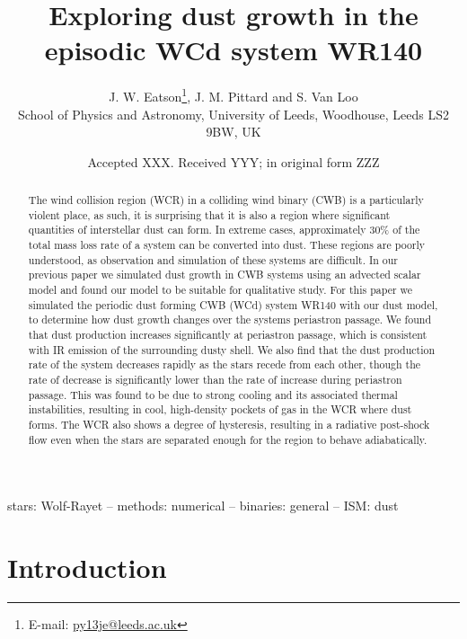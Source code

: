 \documentclass[fleqn,usenatbib]{mnras}
\title[Dust growth simulations of WR140]{Exploring dust growth in the episodic WCd system WR140}
\author[J. W. Eatson, J. M. Pittard \& S. Van Loo]{
J. W. Eatson\thanks{E-mail: \href{mailto:py13je@leeds.ac.uk}{py13je@leeds.ac.uk}},
J. M. Pittard
and
S. Van Loo
\\
School of Physics and Astronomy, University of
       Leeds, Woodhouse, Leeds LS2 9BW, UK\\  
}
\date{Accepted XXX. Received YYY; in original form ZZZ}
\begin{document}
\label{firstpage}
\pagerange{\pageref{firstpage}--\pageref{lastpage}}
\maketitle

\begin{abstract}
  \noindent
  The wind collision region (WCR) in a colliding wind binary (CWB) is a particularly violent place, as such, it is surprising that it is also a region where significant quantities of interstellar dust can form.
  In extreme cases, approximately 30\% of the total mass loss rate of a system can be converted into dust.
  These regions are poorly understood, as observation and simulation of these systems are difficult.
  In our previous paper we simulated dust growth in CWB systems using an advected scalar model and found our model to be suitable for qualitative study.
  For this paper we simulated the periodic dust forming CWB (WCd) system WR140 with our dust model, to determine how dust growth changes over the systems periastron passage.
  We found that dust production increases significantly at periastron passage, which is consistent with IR emission of the surrounding dusty shell.
  We also find that the dust production rate of the system decreases rapidly as the stars recede from each other, though the rate of decrease is significantly lower than the rate of increase during periastron passage.
  This was found to be due to strong cooling and its associated thermal instabilities, resulting in cool, high-density pockets of gas in the WCR where dust forms.
  The WCR also shows a degree of hysteresis, resulting in a radiative post-shock flow even when the stars are separated enough for the region to behave adiabatically.
\end{abstract}

\begin{keywords}
stars: Wolf-Rayet -- methods: numerical -- binaries: general -- ISM: dust
\end{keywords}



\section{Introduction}
\end{document}

